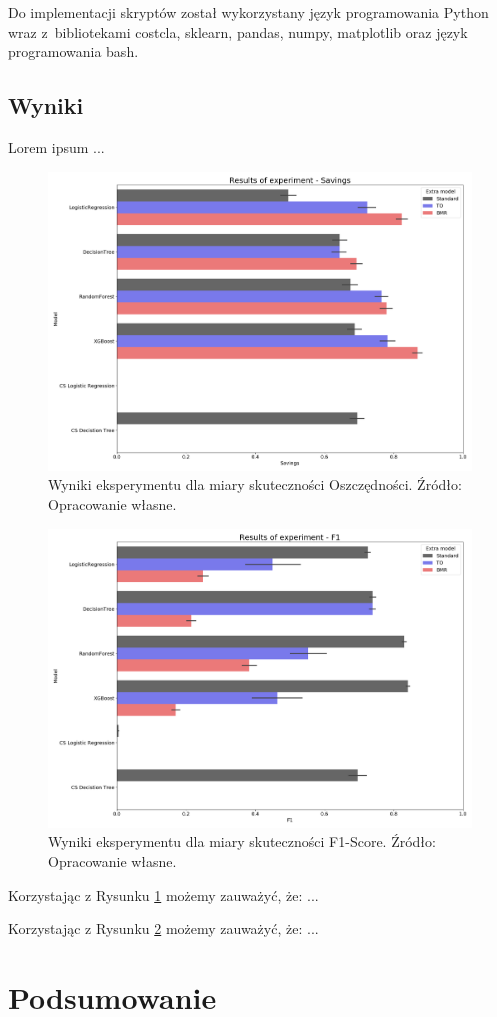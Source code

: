 \documentclass[inzynierska]{pwr_wmat_praca_dyplomowa}
\theoremstyle{plain}
\numberwithin{theorem}{chapter}
\theoremstyle{definition}
\numberwithin{theorem}{chapter}
\begin{document}
Do implementacji skryptów został wykorzystany język programowania Python wraz z~bibliotekami costcla, sklearn, pandas, numpy, matplotlib oraz język programowania bash.

\section{Wyniki}
Lorem ipsum ...

\begin{figure}[h]
	\includegraphics[width=\linewidth]{images/100_config1-Savings.png}
	\caption{Wyniki eksperymentu dla miary skuteczności Oszczędności. Źródło: Opracowanie własne.}	
	\label{fig:results-savings}
\end{figure}

\begin{figure}[h]
	\includegraphics[width=\linewidth]{images/100_config1-F1.png}
	\caption{Wyniki eksperymentu dla miary skuteczności F1-Score. Źródło: Opracowanie własne.}
	\label{fig:results-f1}
\end{figure}

Korzystając z Rysunku \ref{fig:results-savings} możemy zauważyć, że: ...

Korzystając z Rysunku \ref{fig:results-f1} możemy zauważyć, że: ...	


\chapter*{Podsumowanie}


\backmatter
\nocite{*}

\end{document}
